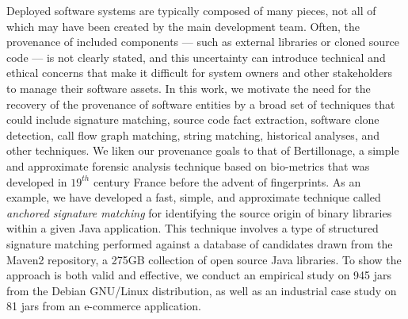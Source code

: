 
Deployed software systems are typically composed of many pieces, not all of
which may have been created by the main development team.  Often, the
provenance of included components --- such as external libraries or cloned
source code --- is not clearly stated, and this uncertainty can introduce
technical and ethical concerns that make it difficult for system
owners and other stakeholders to manage their software assets.
In this work, we motivate
the need for the recovery of the provenance of software entities
by a broad
set of techniques that could include signature matching, source code fact
extraction, software clone detection, call flow graph matching, string
matching, historical analyses, and other techniques.
We liken our provenance goals to
that of Bertillonage, a simple and approximate forensic analysis technique
based on bio-metrics that was developed in $19^{th}$ century France before
the advent of fingerprints.  As an example, we have developed a fast,
simple, and approximate technique called \emph{anchored signature matching}
for identifying the source origin of binary libraries within a given Java
application.  This technique involves a type of structured signature
matching performed against a database of candidates drawn from the Maven2
repository, a 275GB collection of open source Java libraries.
To show the approach is both valid and effective, we conduct
an empirical study on 945 jars from the Debian GNU/Linux distribution,
as well as an industrial case study on 81 jars from an e-commerce
application. 



%
%
%




